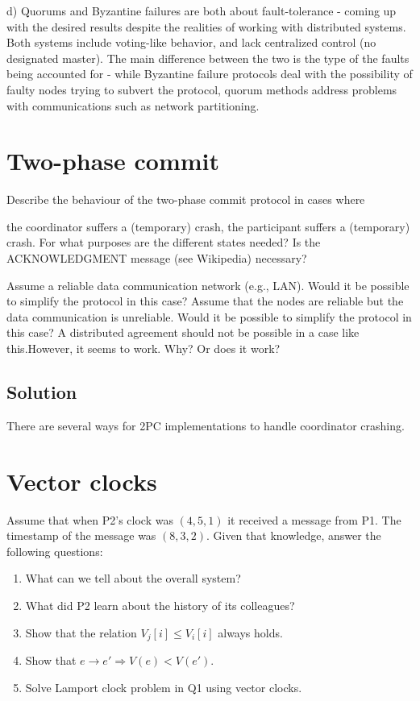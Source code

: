 \documentclass[12pt,a4paper,titlepage]{article}
\begin{document}
d) Quorums and Byzantine failures are both about fault-tolerance - coming up with the desired results despite the realities of working with distributed systems. Both systems include voting-like behavior, and lack centralized control (no designated master). The main difference between the two is the type of the faults being accounted for - while Byzantine failure protocols deal with the possibility of faulty nodes trying to subvert the protocol, quorum methods address problems with communications such as network partitioning.


\section{Two-phase commit}

Describe the behaviour of the two-phase commit protocol in cases where

the coordinator suffers a (temporary) crash,
the participant suffers a (temporary) crash.
For what purposes are the different states needed?
Is the ACKNOWLEDGMENT message (see Wikipedia) necessary?


Assume a reliable data communication network (e.g., LAN). Would it be possible to simplify the protocol in this case?
Assume that the nodes are reliable but the data communication is unreliable. Would it be possible to simplify the protocol in this case?
A distributed agreement should not be possible in a case like this.However, it seems to work. Why? Or does it work?

\subsection{Solution}

There are several ways for 2PC implementations to handle coordinator crashing.

\section{Vector clocks}

Assume that when P2's clock was $(4, 5, 1)$ it received a message from P1. The timestamp of the message was $(8, 3, 2)$. Given that knowledge, answer the following questions:

\begin{enumerate}
\item What can we tell about the overall system?
\item What did P2 learn about the history of its colleagues?
\item Show that the relation $V_j[i] \leq V_i[i]$ always holds.
\item Show that $e \to e' \Rightarrow V(e) < V(e')$.
\item Solve Lamport clock problem in Q1 using vector clocks.
\end{enumerate}
\end{document}
